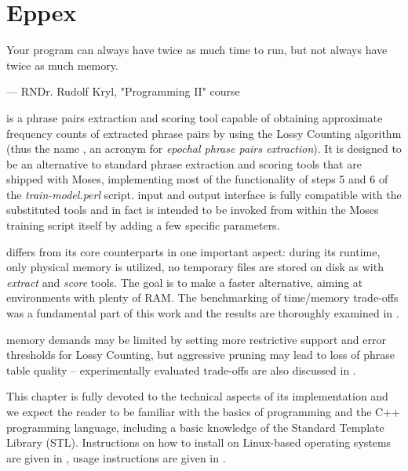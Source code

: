 
\chapter{Eppex}
\label{chap:eppex}

\setlength{\epigraphwidth}{1.0\textwidth}
\epigraph{Your program can always have twice as much time to run, but not always have twice as much memory.}{--- RNDr. Rudolf Kryl, "Programming II" course}

\Eppex{} is a phrase pairs extraction and scoring tool capable of obtaining approximate
frequency counts of extracted phrase pairs by using the Lossy Counting algorithm
(thus the name \eppex{}, an acronym for \emph{epochal phrase pairs extraction}).
It is designed to be an alternative to standard phrase extraction and scoring tools that
are shipped with Moses, implementing most of the functionality of steps 5 and 6 of the
\emph{train-model.perl} script.
\Eppex{} input and output interface is fully compatible with the substituted tools
and \eppex{} in fact is intended to be invoked from within the Moses training script itself
by adding a few specific parameters.

\Eppex{} differs from its core counterparts in one important aspect: during its runtime,
only physical memory is utilized, no temporary files are stored on disk as with \emph{extract}
and \emph{score} tools.
The goal is to make \eppex{} a faster alternative, aiming at environments with plenty of RAM.
The benchmarking of time/memory trade-offs was a fundamental part of this work and the results are
thoroughly examined in .

\Eppex{} memory demands may be limited by setting more restrictive support and error thresholds
for Lossy Counting, but aggressive pruning may lead to loss of phrase table quality --
experimentally evaluated trade-offs are also discussed in .

This chapter is fully devoted to the technical aspects of its implementation and we expect the reader
to be familiar with the basics of programming and the C++ programming language, including
a basic knowledge of the Standard Template Library (STL).
Instructions on how to install \eppex{} on Linux-based operating systems are given in
, usage instructions are given in .

